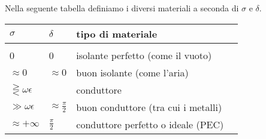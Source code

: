 Nella seguente tabella definiamo i diversi materiali a seconda di $\sigma$ e $\delta$.
\begin{table}[h] \label{tab:conductors}
\centering
\begin{tabular}{llll}
	$\sigma$                      & $\delta$                & tipo di materiale                  \\
	\hline \\
	0                             & 0                       & isolante perfetto (come il vuoto)                 \\
	$\approx 0$                   & $\approx 0$             & buon isolante (come l'aria)                     \\
	$\gtreqless \omega \epsilon $ &                         & conduttore                         \\
	$\gg \omega \epsilon$         & $\approx \frac{\pi}{2}$ & buon conduttore (tra cui i metalli)                    \\
	$\approx +\infty$             & $\frac{\pi}{2}$         & conduttore perfetto o ideale (PEC)
\end{tabular}
\end{table}
